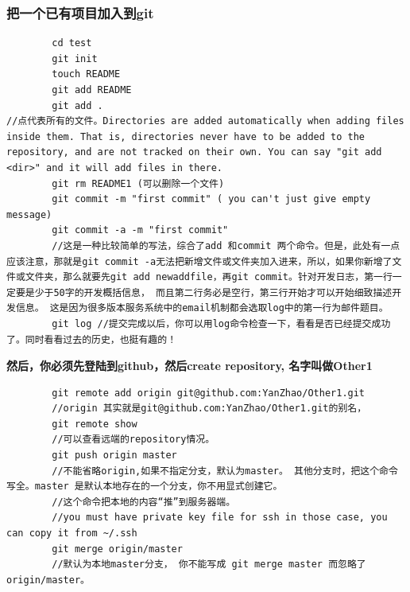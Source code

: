 \documentclass[a4paper,12pt,twoside]{book}
\begin{document}
\begin{CJK*}{UTF8}{song}
\subsubsection{把一个已有项目加入到git}
        \begin{verbatim}
		cd test
		git init
		touch README
		git add README
		git add .
//点代表所有的文件。Directories are added automatically when adding files inside them. That is, directories never have to be added to the repository, and are not tracked on their own. You can say "git add <dir>" and it will add files in there.
		git rm README1 (可以删除一个文件)
		git commit -m "first commit" ( you can't just give empty message)
		git commit -a -m "first commit"
		//这是一种比较简单的写法，综合了add 和commit 两个命令。但是，此处有一点应该注意，那就是git commit -a无法把新增文件或文件夹加入进来，所以，如果你新增了文件或文件夹，那么就要先git add newaddfile，再git commit。针对开发日志，第一行一定要是少于50字的开发概括信息， 而且第二行务必是空行，第三行开始才可以开始细致描述开发信息。 这是因为很多版本服务系统中的email机制都会选取log中的第一行为邮件题目。
		git log //提交完成以后，你可以用log命令检查一下，看看是否已经提交成功了。同时看看过去的历史，也挺有趣的！
        \end{verbatim}
        \textbf{然后，你必须先登陆到github，然后create repository, 名字叫做Other1}
        \begin{verbatim}
		git remote add origin git@github.com:YanZhao/Other1.git
		//origin 其实就是git@github.com:YanZhao/Other1.git的别名，
		git remote show
		//可以查看远端的repository情况。
		git push origin master 	
        //不能省略origin,如果不指定分支，默认为master。 其他分支时，把这个命令写全。master 是默认本地存在的一个分支，你不用显式创建它。
		//这个命令把本地的内容“推”到服务器端。
		//you must have private key file for ssh in those case, you can copy it from ~/.ssh
        git merge origin/master
        //默认为本地master分支， 你不能写成 git merge master 而忽略了origin/master。
		\end{verbatim}


\end{CJK*}
\end{document}
